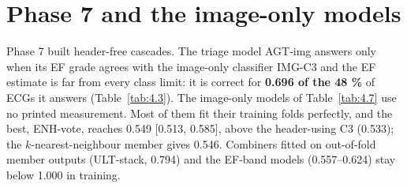 \section{Phase 7 and the image-only models}\label{sec:4.5}



Phase 7 built header-free cascades. The triage model AGT-img answers only when its EF grade agrees with the image-only classifier IMG-C3 and the EF estimate is far from every class limit: it is correct for \textbf{0.696 of the 48 \%} of ECGs it answers (Table~\ref{tab:4.3}). The image-only models of Table~\ref{tab:4.7} use no printed measurement. Most of them fit their training folds perfectly, and the best, ENH-vote, reaches 0.549 [0.513, 0.585], above the header-using C3 (0.533); the $k$-nearest-neighbour member gives 0.546. Combiners fitted on out-of-fold member outputs (ULT-stack, 0.794) and the EF-band models (0.557--0.624) stay below 1.000 in training.
